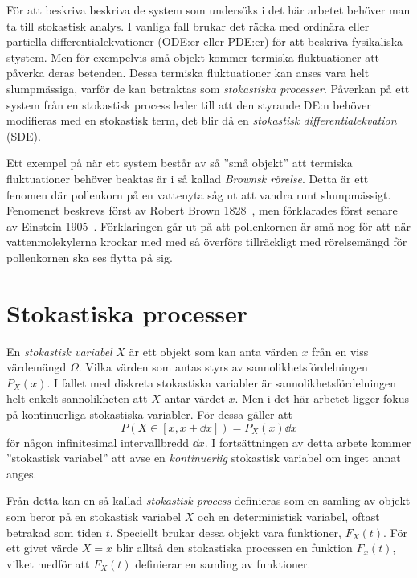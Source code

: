 
För att beskriva beskriva de system som undersöks i det här arbetet
behöver man ta till stokastisk analys. I vanliga fall brukar
det räcka med ordinära eller partiella differential\-ekvationer (ODE:er
eller PDE:er) för att beskriva fysikaliska stystem. Men för exempelvis
små objekt kommer termiska fluktuationer att påverka deras
betenden. Dessa termiska fluktuationer kan anses vara helt
slumpmässiga, varför de kan betraktas som \emph{stokastiska
  processer}. Påverkan på ett system från en stokastisk process leder
till att den styrande DE:n behöver modifieras med en stokastisk term,
det blir då en \emph{stokastisk differentialekvation} (SDE).

Ett exempel på när ett system består av så ''små objekt'' att termiska
fluktuationer behöver beaktas är i så kallad \emph{Brownsk rörelse}. 
Detta är ett fenomen där pollenkorn på en vattenyta såg ut att vandra
runt slumpmässigt. Fenomenet beskrevs först av Robert Brown
1828~\cite{Brown1828}, men förklarades först senare av Einstein
1905~\cite{Einstein1905}. Förklaringen går ut på att pollenkornen är
små nog för att när vattenmolekylerna krockar med med så överförs
tillräckligt med rörelsemängd för pollenkornen ska ses flytta på sig. 

\section{Stokastiska processer}
En \emph{stokastisk variabel} $X$ är ett objekt som kan anta värden
$x$ från en viss värdemängd $\Omega$. Vilka värden som antas styrs av
sannolikhetsfördelningen $P_X(x)$. I fallet med diskreta stokastiska
variabler är sannolikhetsfördelningen helt enkelt sannolikheten att
$X$ antar värdet $x$. Men i det här arbetet ligger fokus på
kontinuerliga stokastiska variabler. För dessa gäller att 
\begin{equation}
P(X\in[x, x+\dd{x}]) =P_X(x)\dd{x}
\end{equation}
för någon infinitesimal intervallbredd $\dd{x}$. 
I fortsättningen av detta arbete kommer ''stokastisk variabel'' att
avse en \emph{kontinuerlig} stokastisk variabel om inget annat anges.


Från detta kan en så kallad \emph{stokastisk process} definieras som en
samling av objekt som beror på en stokastisk variabel $X$ och en
deterministisk variabel, oftast betrakad som tiden\footnotemark{}
$t$. Speciellt brukar dessa objekt vara 
funktioner, $F_X(t)$. För ett givet värde $X=x$ blir alltså den
stokastiska processen en funktion $F_x(t)$, vilket medför att $F_X(t)$
definierar en samling av funktioner. 

